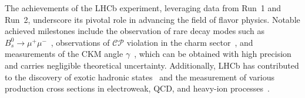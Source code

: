 The achievements of the LHCb experiment, leveraging data from Run~1 and Run~2, underscore its pivotal role in advancing the field of flavor physics. Notable achieved milestones include the observation of rare decay modes such as $B^0_s\rightarrow\mu^+\mu^-$~\cite{PhysRevLett.111.101805}, observations of $\mathcal{CP}$ violation in the charm sector~\cite{Maccolini:2022y6}, and measurements of the CKM angle $\gamma$~\cite{Aaij_2016}, which can be obtained with high precision and carries negligible theoretical uncertainty. Additionally, LHCb has contributed to the discovery of exotic hadronic states~\cite{FANG202266, PhysRevLett.115.072001} and the measurement of various production cross sections in electroweak, QCD, and heavy-ion processes~\cite{ZBoson, Raab:2815873, Duan:2826531}.






